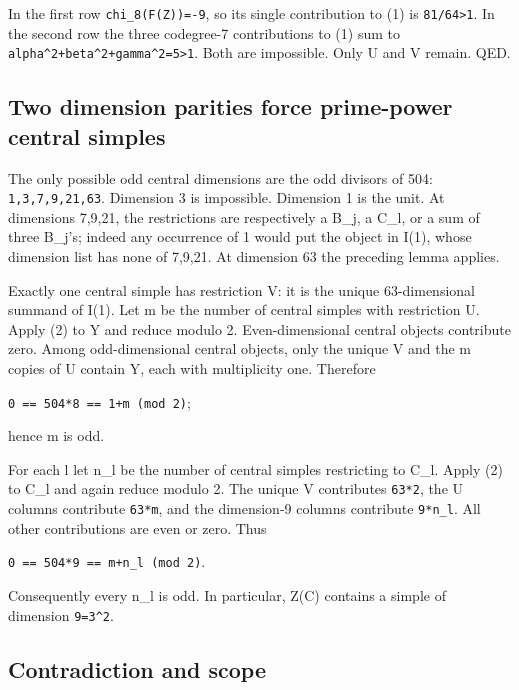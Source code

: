 In the first row
\texttt{chi\_\allowbreak{}8(F(Z)\allowbreak{})=-\allowbreak{}9}, so its
single contribution to (1) is \texttt{81/\allowbreak{}64>1}. In the
second row the three codegree-7 contributions to (1) sum to
\texttt{alpha\textasciicircum{}\allowbreak{}2+beta\allowbreak{}\textasciicircum{}2+gam\allowbreak{}ma\textasciicircum{}2=5\allowbreak{}>1}.
Both are impossible. Only U and V remain. QED.

\hypertarget{two-dimension-parities-force-prime-power-central-simples}{%
\subsection{Two dimension parities force prime-power central
simples}\label{two-dimension-parities-force-prime-power-central-simples}}

The only possible odd central dimensions are the odd divisors of 504:
\texttt{1,3,7,\allowbreak{}9,21,6\allowbreak{}3}. Dimension 3 is
impossible. Dimension 1 is the unit. At dimensions 7,9,21, the
restrictions are respectively a B\_j, a C\_l, or a sum of three B\_j's;
indeed any occurrence of 1 would put the object in I(1), whose dimension
list has none of 7,9,21. At dimension 63 the preceding lemma applies.

Exactly one central simple has restriction V: it is the unique
63-dimensional summand of I(1). Let m be the number of central simples
with restriction U. Apply (2) to Y and reduce modulo 2. Even-dimensional
central objects contribute zero. Among odd-dimensional central objects,
only the unique V and the m copies of U contain Y, each with
multiplicity one. Therefore

\texttt{0 == 5\allowbreak{}04*8 =\allowbreak{}= 1+m \allowbreak{}(mod 2\allowbreak{})};

hence m is odd.

For each l let n\_l be the number of central simples restricting to
C\_l. Apply (2) to C\_l and again reduce modulo 2. The unique V
contributes \texttt{63*2}, the U columns contribute \texttt{63*m}, and
the dimension-9 columns contribute \texttt{9*n\_\allowbreak{}l}. All
other contributions are even or zero. Thus

\texttt{0 == 5\allowbreak{}04*9 =\allowbreak{}= m+n\_\allowbreak{}l (mod\allowbreak{} 2)}.

Consequently every n\_l is odd. In particular, Z(C) contains a simple of
dimension \texttt{9=3\textasciicircum{}2}.

\hypertarget{contradiction-and-scope}{%
\subsection{Contradiction and scope}\label{contradiction-and-scope}}

